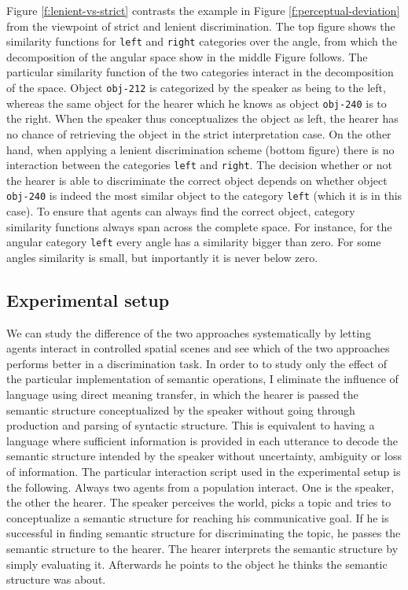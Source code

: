 Figure \ref {f:lenient-vs-strict} contrasts the example in Figure \ref{f:perceptual-deviation} 
from the viewpoint of strict and lenient discrimination. The top figure shows 
the similarity functions for {\footnotesize\tt left} and {\footnotesize\tt right} categories over the angle, 
from which the decomposition of the angular space show in the middle Figure follows.
The particular similarity function of the two categories interact in the decomposition
of the space. Object {\footnotesize\tt obj-212} is categorized by the speaker as being to the
left, whereas the same object for the hearer which he knows as object {\footnotesize\tt obj-240} is 
to the right. When the speaker thus conceptualizes the object as left, the hearer has no 
chance of retrieving the object in the strict interpretation case. On the other hand, when
applying a lenient discrimination scheme (bottom figure) there is no interaction 
between the categories {\footnotesize\tt left} and {\footnotesize\tt right}.
The decision whether or not the hearer is able to discriminate the correct object
depends on whether object {\footnotesize\tt obj-240} is indeed the most similar object
to the category {\footnotesize\tt left} (which it is in this case). To ensure that agents
can always find the correct object, category similarity functions always
span across the complete space. For instance, for the angular category
{\footnotesize\tt left} every angle has a similarity bigger than zero. For some angles
similarity is small, but importantly it is never below zero.

\subsection{Experimental setup}
We can study the difference of the two approaches systematically by letting agents
interact in controlled spatial scenes and see
which of the two approaches performs better in a discrimination task. 
In order to to study only the effect of the particular implementation of semantic 
operations, I eliminate the influence of language using 
direct meaning transfer, in which the hearer is passed the
semantic structure conceptualized by the speaker without going
through production and parsing of syntactic structure. 
This is equivalent to having 
a language where sufficient information is provided in each utterance
to decode the semantic structure intended by the speaker 
without uncertainty, ambiguity or loss of information.
The particular interaction script used in the experimental
setup is the following. Always two agents from a population interact. 
One is the speaker, the other the hearer. The speaker perceives the world,
picks a topic and tries to conceptualize a semantic structure
for reaching his communicative goal. If he is successful in finding
semantic structure for discriminating the topic, he passes the semantic
structure to the hearer. The hearer interprets the semantic structure
by simply evaluating it. Afterwards he points to the object he
thinks the semantic structure was about. 

